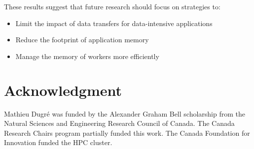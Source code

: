 \documentclass[AMA,STIX1COL]{WileyNJD-v2}
\begin{document}
These results suggest that future research should focus on strategies to:
\begin{itemize}
	\item Limit the impact of data transfers for data-intensive applications
	\item Reduce the footprint of application memory
	\item Manage the memory of workers more efficiently
\end{itemize}
																					
\section*{Acknowledgment}
Mathieu Dugr\'e was funded by the Alexander Graham Bell scholarship from
the Natural Sciences and Engineering Research Council of Canada.
The Canada Research Chairs program partially funded this work.
The Canada Foundation for Innovation funded the HPC cluster.
																		

\end{document}

